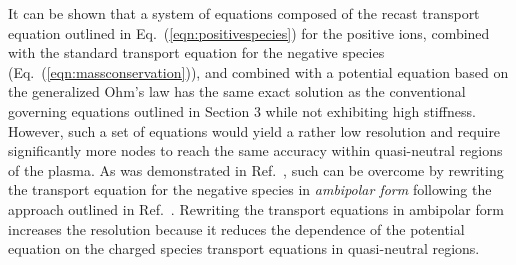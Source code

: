 \documentclass{warpdoc}
\begin{document}
It can be shown that a system of equations composed of the recast transport equation outlined in Eq.\ (\ref{eqn:positivespecies}) for the positive ions, combined with the standard transport equation for the negative species (Eq.\ (\ref{eqn:massconservation})), and combined with a potential equation based on the generalized Ohm's law \cite{jcp:2011:parent} has the same exact solution as the conventional governing equations outlined in Section 3 while not exhibiting high stiffness. However, such a set of equations would yield a rather low resolution and require significantly more nodes to reach the same accuracy within quasi-neutral regions of the plasma. As was  demonstrated in Ref.\ \cite{jcp:2013:parent}, such can be overcome by rewriting the transport equation for the negative species in \emph{ambipolar form} following the approach outlined in Ref.\ \cite{jcp:2011:parent:2}. Rewriting the transport equations in ambipolar form increases the resolution because it reduces the dependence of the potential equation on the charged species transport equations in quasi-neutral regions.     
\end{document}

